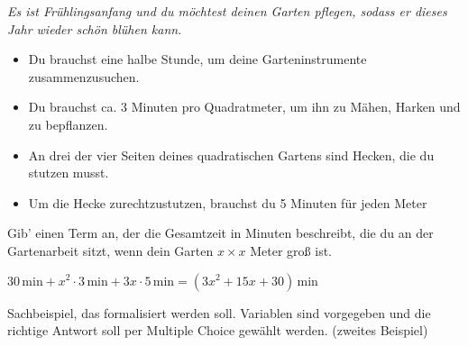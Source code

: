 \documentclass[solution]{uebungsblatt}
\begin{document}
\begin{exercise}
    {\itshape Es ist Frühlingsanfang und du möchtest deinen Garten pflegen, sodass er dieses Jahr wieder schön blühen kann.
    \begin{itemize}[nosep]
        \item Du brauchst eine halbe Stunde, um deine Garteninstrumente zusammenzusuchen.
        \item Du brauchst ca. 3 Minuten pro Quadratmeter, um ihn zu Mähen, Harken und zu bepflanzen.
        \item An drei der vier Seiten deines quadratischen Gartens sind Hecken, die du stutzen musst.
        \item Um die Hecke zurechtzustutzen, brauchst du 5 Minuten für jeden Meter
    \end{itemize}}
    Gib' einen Term an, der die Gesamtzeit in Minuten beschreibt, die du an der Gartenarbeit sitzt, wenn dein Garten $x\times x$ Meter groß ist.
    \begin{answerbox}
        $30\,\text{min} + x^2\cdot 3\,\text{min} + 3x\cdot 5\,\text{min} = (3x^2+15x+30)\,\text{min}$
    \end{answerbox}
\end{exercise}
\begin{exercise}
    Sachbeispiel, das formalisiert werden soll. Variablen sind vorgegeben und die richtige Antwort soll per Multiple Choice gewählt werden. (zweites Beispiel)
\end{exercise}

\end{document}
